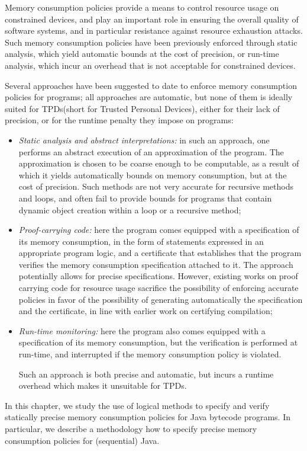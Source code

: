 
Memory consumption policies provide a means to control
resource usage on constrained devices, and play an important role
in ensuring the overall quality of software systems, and in
particular resistance against resource exhaustion attacks. Such
memory consumption policies have been previously enforced through
static analysis, which yield automatic bounds at the
cost of precision, or run-time analysis, which incur an overhead
that is not acceptable for constrained devices.

Several approaches have been suggested to date to enforce memory
consumption policies for programs; all approaches are automatic,
but none of them is ideally suited for TPDs(short for Trusted Personal Devices), either for their lack of precision, or for the runtime penalty they impose on
programs:
\begin{itemize}
\item \emph{Static analysis and abstract interpretations:} in such an
approach, one performs an abstract execution of an approximation of
the program. The approximation is chosen to be coarse enough to be
computable, as a result of which it yields automatically bounds on
memory consumption, but at the cost of precision. Such methods are not
very accurate for recursive methods and loops, and often fail to
provide bounds for programs that contain dynamic object creation
within a loop or a recursive method;


\item \emph{Proof-carrying code:} here the program
comes equipped with a specification of its memory consumption, in the
form of statements expressed in an appropriate program logic, and a
certificate that establishes that the program verifies the memory
consumption specification attached to it. The approach potentially
allows for precise specifications. However, existing works on proof
carrying code for resource usage sacrifice the possibility of
enforcing accurate policies in favor of the possibility of generating
automatically the specification and the certificate, in line with
earlier work on certifying compilation;

\item \emph{Run-time monitoring:} here the program also comes equipped
with a specification of its memory consumption, but the verification
is performed at run-time, and interrupted if the memory consumption
policy is violated.
 


Such an approach is both precise and automatic, but incurs a runtime
overhead which makes it unsuitable for TPDs.
\end{itemize}
In this chapter, we study the use of logical methods to specify and
verify statically precise memory consumption policies for Java
bytecode programs. In particular, we describe a methodology how 
to specify precise memory consumption policies
for (sequential) Java.

